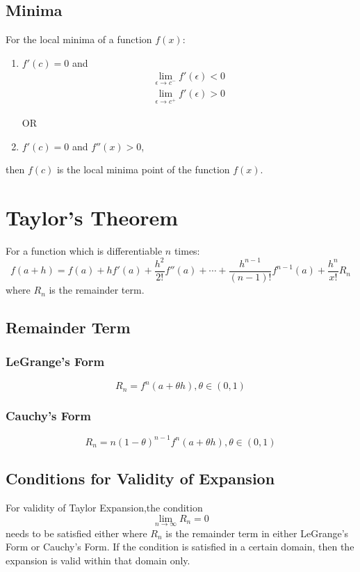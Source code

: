 \subsection{Minima}
For the local minima of a function $f(x)$:
\begin{enumerate}
	\item $f'(c)=0$ and
	\begin{align}
		\lim_{\epsilon\to c^{-}} f'(\epsilon)<0\nonumber\\
		\lim_{\epsilon\to c^{+}} f'(\epsilon)>0\nonumber
	\end{align}
	\begin{center}
		OR
	\end{center}
	\item $f'(c)=0$ and $f''(x)>0$,
\end{enumerate}
then $f(c)$ is the local minima point of the function $f(x)$.


\section{Taylor's Theorem}
For a function which is differentiable $n$ times:
\begin{equation}
	f(a+h)=f(a)+hf'(a)+\dfrac{h^2}{2!}f''(a)+\cdots+\dfrac{h^{n-1}}{(n-1)!} f^{n-1}(a)+\dfrac{h^n}{x!}R_n
\end{equation}
where $R_n$ is the remainder term.

\subsection{Remainder Term}
\subsubsection{LeGrange's Form}
\begin{equation}
	R_n=f^n (a+\theta h), \theta \in (0,1)
\end{equation}

\subsubsection{Cauchy's Form}
\begin{equation}
	R_n=n(1-\theta)^{n-1}f^n(a+\theta h), \theta \in (0,1)
\end{equation}

\subsection{Conditions for Validity of Expansion}
For validity of Taylor Expansion,the condition
\begin{equation}
	\lim_{n\to\infty} R_n=0
\end{equation}
needs to be satisfied either where $R_n$ is the remainder term in either LeGrange's Form or Cauchy's Form. If the condition is satisfied in a certain domain, then the expansion is valid within that domain only.

